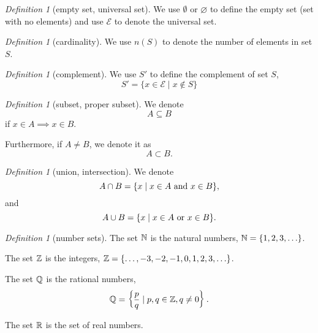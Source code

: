 \documentclass[8pt]{article}
\theoremstyle{remark}
\newtheorem{definition}[theorem]{Definition}
\begin{document}
            \begin{definition}[empty set, universal set]
                We use $\emptyset$ or $\varnothing$ to define the empty set (set with no elements) and use $\mathcal{E}$ to denote the universal set.
            \end{definition}

            \begin{definition}[cardinality]
                We use $n(S)$ to denote the number of elements in set $S$.
            \end{definition}

            \begin{definition}[complement]
                We use $S'$ to define the complement of set $S$,
                $$
                    S' = \{x \in \mathcal{E} \mid x \notin S\}
                $$
            \end{definition}

            \begin{definition}[subset, proper subset]
                We denote 
                $$A \subseteq B$$
                if $x \in A \implies x \in B$.

                Furthermore, if $A \neq B$, we denote it as
                $$A \subset B.$$
            \end{definition}

            \begin{definition}[union, intersection]
                We denote
                $$
                    A \cap B = \{x \mid x \in A \text{ and } x \in B\},
                $$
                and
                $$
                    A \cup B = \{x \mid x \in A \text{ or } x \in B\}.
                $$
            \end{definition}

            \begin{definition}[number sets]
                The set $\mathbb{N}$ is the natural numbers, $\mathbb{N} = \{ 1, 2, 3, \ldots \}$.

                The set $\mathbb{Z}$ is the integers, $\mathbb{Z} = \{\ldots, -3, -2, -1, 0, 1, 2, 3, \ldots\}$.

                The set $\mathbb{Q}$ is the rational numbers,
                $$
                    \mathbb{Q} = \left\{\frac{p}{q} \mid p, q \in \mathbb{Z}, q \neq 0\right\}.
                $$

                The set $\mathbb{R}$ is the set of real numbers.
            \end{definition}
\end{document}
